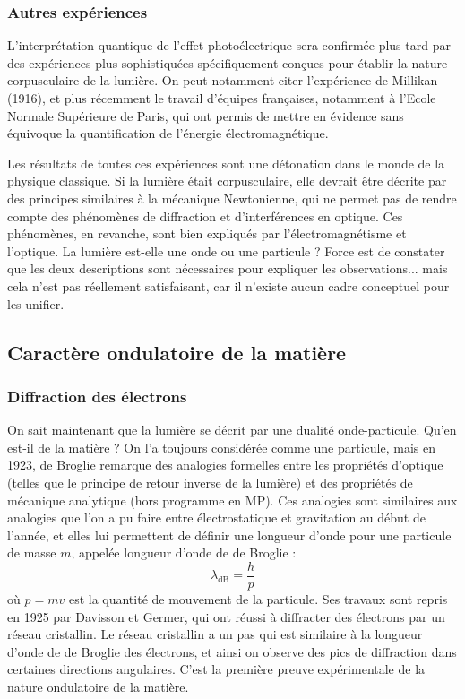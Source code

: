 \documentclass[11pt,fleqn]{book} %
\begin{document}
\subsubsection{Autres expériences}

L'interprétation quantique de l'effet photoélectrique sera confirmée plus tard par des expériences plus sophistiquées spécifiquement conçues pour établir la nature corpusculaire de la lumière. On peut notamment citer l'expérience de Millikan (1916), et plus récemment le travail d'équipes françaises, notamment à l'Ecole Normale Supérieure de Paris, qui ont permis de mettre en évidence sans équivoque la quantification de l'énergie électromagnétique.

Les résultats de toutes ces expériences sont une détonation dans le monde de la physique classique. Si la lumière était corpusculaire, elle devrait être décrite par des principes similaires à la mécanique Newtonienne, qui ne permet pas de rendre compte des phénomènes de diffraction et d'interférences en optique. Ces phénomènes, en revanche, sont bien expliqués par l'électromagnétisme et l'optique. La lumière est-elle une onde ou une particule ? Force est de constater que les deux descriptions sont nécessaires pour expliquer les observations... mais cela n'est pas réellement satisfaisant, car il n'existe aucun cadre conceptuel pour les unifier.

\subsection{Caractère ondulatoire de la matière}

\subsubsection{Diffraction des électrons}

On sait maintenant que la lumière se décrit par une dualité onde-particule. Qu'en est-il de la matière ? On l'a toujours considérée comme une particule, mais en 1923, de Broglie remarque des analogies formelles entre les propriétés d'optique (telles que le principe de retour inverse de la lumière) et des propriétés de mécanique analytique (hors programme en MP). Ces analogies sont similaires aux analogies que l'on a pu faire entre électrostatique et gravitation au début de l'année, et elles lui permettent de définir une longueur d'onde pour une particule de masse $m$, appelée longueur d'onde de de Broglie :
\begin{equation}
	\lambda_{\mathrm{dB}} = \frac{h}{p}
\end{equation}
où $p = m v$ est la quantité de mouvement de la particule. Ses travaux sont repris en 1925 par Davisson et Germer, qui ont réussi à diffracter des électrons par un réseau cristallin. Le réseau cristallin a un pas qui est similaire à la longueur d'onde de de Broglie des électrons, et ainsi on observe des pics de diffraction dans certaines directions angulaires. C'est la première preuve expérimentale de la nature ondulatoire de la matière.
\end{document}
